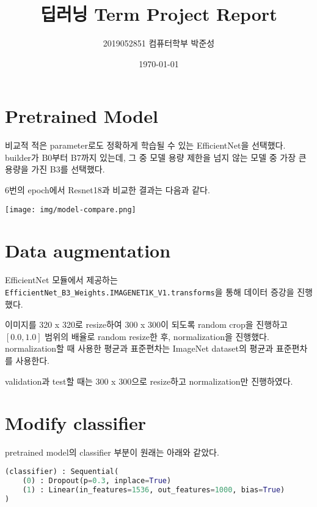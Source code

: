 
\usetikzlibrary{arrows.meta,matrix,decorations.pathreplacing}
\setmainfont{Times New Roman} %
\renewcommand{\contentsname}{목차} %
\setcounter{tocdepth}{1} %

\title{딥러닝 Term Project Report}
\author{2019052851 컴퓨터학부 박준성}
\date{\today}


\maketitle

\tableofcontents
\section{Pretrained Model}
비교적 적은 parameter로도 정확하게 학습될 수 있는 EfficientNet을 선택했다.
builder가 B0부터 B7까지 있는데, 그 중 모델 용량 제한을 넘지 않는 모델 중 가장 큰 용량을 가진 B3를 선택했다.

6번의 epoch에서 Resnet18과 비교한 결과는 다음과 같다.
\begin{center}
    \texttt{[image: img/model-compare.png]}
\end{center}

\section{Data augmentation}
EfficientNet 모듈에서 제공하는 \texttt{EfficientNet\_B3\_Weights.IMAGENET1K\_V1.transforms}을 통해 데이터 증강을 진행했다.

이미지를 320 x 320로 resize하여 300 x 300이 되도록 random crop을 진행하고 $[0.0, 1.0]$ 범위의 배율로 random resize한 후, normalization을 진행했다.
normalization할 때 사용한 평균과 표준편차는 ImageNet dataset의 평균과 표준편차를 사용한다.

validation과 test할 때는 300 x 300으로 resize하고 normalization만 진행하였다.

\section{Modify classifier}
pretrained model의 classifier 부분이 원래는 아래와 같았다.
\begin{lstlisting}[language=Python]
(classifier) : Sequential(
    (0) : Dropout(p=0.3, inplace=True)
    (1) : Linear(in_features=1536, out_features=1000, bias=True)
) 
\end{lstlisting}

